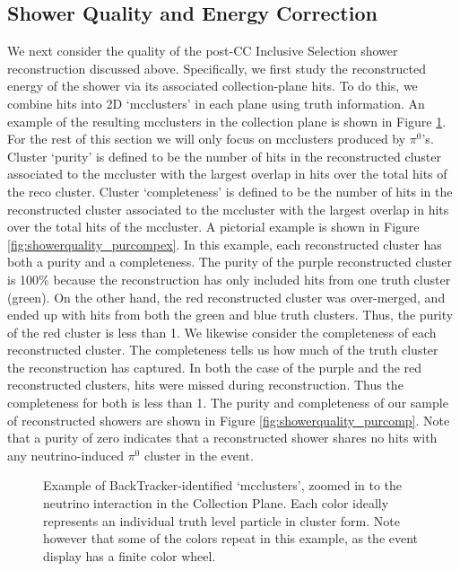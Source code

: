 \subsection{Shower Quality and Energy Correction}
We next consider the quality of the post-CC Inclusive Selection shower reconstruction discussed above.  Specifically, we first study the reconstructed energy of the shower via its associated collection-plane hits. To do this, we combine hits into 2D `mcclusters' in each plane using truth information.  An example of the resulting mcclusters in the collection plane is shown in Figure \ref{fig:mcclusters}. For the rest of this section we will only focus on mcclusters produced by $\pi^0$'s. Cluster `purity' is defined to be the number of hits in the reconstructed cluster associated to the mccluster with the largest overlap in hits over the total hits of the reco cluster. Cluster `completeness' is defined to be the number of hits in the reconstructed cluster associated to the mccluster with the largest overlap in hits over the total hits of the mccluster. A pictorial example is shown in Figure \ref{fig:showerquality_purcompex}. In this example, each reconstructed cluster has both a purity and a completeness.  The purity of the purple reconstructed cluster is 100\% because the reconstruction has only included hits from one truth cluster (green). On the other hand, the red reconstructed cluster was over-merged, and ended up with hits from both the green and blue truth clusters.  Thus, the purity of the red cluster is less than 1. We likewise consider the completeness of each reconstructed cluster. The completeness tells us how much of the truth cluster the reconstruction has captured.  In both the case of the purple and the red reconstructed clusters, hits were missed during reconstruction. Thus the completeness for both is less than 1.  The purity and completeness of our sample of reconstructed showers are shown in Figure \ref{fig:showerquality_purcomp}. Note that a purity of zero indicates that a reconstructed shower shares no hits with any neutrino-induced $\pi^0$ cluster in the event. 

\begin{figure}[h!]
\centering
{}
\caption{ Example of BackTracker-identified `mcclusters', zoomed in to the neutrino interaction in the Collection Plane. Each color ideally represents an individual truth level particle in cluster form. Note however that some of the colors repeat in this example, as the event display has a finite color wheel. }
\label{fig:mcclusters}
\end{figure}


